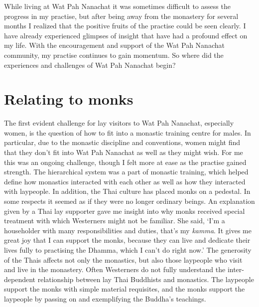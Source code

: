 While living at Wat Pah Nanachat it was sometimes difficult to assess
the progress in my practise, but after being away from the monastery for
several months I realized that the positive fruits of the practise could
be seen clearly. I have already experienced glimpses of insight that
have had a profound effect on my life. With the encouragement and
support of the Wat Pah Nanachat community, my practise continues to gain
momentum. So where did the experiences and challenges of Wat Pah
Nanachat begin? 

\section{Relating to monks}

The first evident challenge for lay visitors to Wat Pah Nanachat, 
especially women, is the question of how to fit into a monastic training
centre for males. In particular, due to the monastic discipline and
conventions, women might find that they don't fit into Wat Pah Nanachat
as well as they might wish. For me this was an ongoing challenge, though
I felt more at ease as the practise gained strength. The hierarchical
system was a part of monastic training, which helped define how
monastics interacted with each other as well as how they interacted with
laypeople. In addition, the Thai culture has placed monks on a pedestal. 
In some respects it seemed as if they were no longer ordinary beings. An
explanation given by a Thai lay supporter gave me insight into why monks
received special treatment with which Westerners might not be familiar. 
She said, `I'm a householder with many responsibilities and duties, 
that's my \emph{kamma}. It gives me great joy that I can support the
monks, because they can live and dedicate their lives fully to
practising the Dhamma, which I can't do right now.' The generosity of
the Thais affects not only the monastics, but also those laypeople who
visit and live in the monastery. Often Westerners do not fully
understand the inter-dependent relationship between lay Thai Buddhists
and monastics. The laypeople support the monks with simple material
requisites, and the monks support the laypeople by passing on and
exemplifying the Buddha's teachings. 

